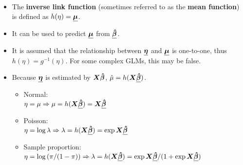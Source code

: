 \begin{frame}
  \begin{itemize}
    \vspace{0.15cm}
    \item The \textbf{inverse link function} (sometimes referred to as the \textbf{mean function}) is defined as $ h(\eta) = \boldsymbol{\underline{\mu}} $.
    \vspace{0.25cm}
    \item It can be used to predict $ \boldsymbol{\underline{\mu}} $ from $ \boldsymbol{\underline{\hat{\beta}}} $. 
    \vspace{0.25cm}
    \item It is assumed that the relationship between $ \boldsymbol{\underline{\eta}} $ and $ \boldsymbol{\underline{\mu}} $ is one-to-one, thus $ h(\eta) = g^{-1}(\eta) $. For some complex GLMs, this may be false.
    \vspace{0.25cm}
    \item Because $ \boldsymbol{\underline{\eta}} $ is estimated by $ \boldsymbol{X}\boldsymbol{\hat{\beta}}$, $ \hat{\mu} = h(\boldsymbol{X}\boldsymbol{\underline{\hat{\beta}}}) $.
      \begin{itemize}
        \vspace{0.15cm}
        \item Normal: \\
          \hspace{1cm} $ \eta = \mu \Rightarrow \mu = h(\boldsymbol{X}\boldsymbol{\underline{\hat{\beta}}}) = \boldsymbol{X}\boldsymbol{\underline{\hat{\beta}}} $
        \vspace{0.15cm}
        \item Poisson: \\
          \hspace{1cm} $ \eta = \log{\lambda} \Rightarrow \lambda = h(\boldsymbol{X}\boldsymbol{\underline{\hat{\beta}}}) = \exp{\boldsymbol{X}\boldsymbol{\underline{\hat{\beta}}}} $
        \vspace{0.15cm}
        \item Sample proportion: \\
          \hspace{1cm} $ \eta = \log{(\pi/(1-\pi))} \Rightarrow \lambda = h(\boldsymbol{X}\boldsymbol{\underline{\hat{\beta}}}) = \exp{\boldsymbol{X}\boldsymbol{\underline{\hat{\beta}}}}/(1+\exp{\boldsymbol{X}\boldsymbol{\underline{\hat{\beta}}}}) $ \\
      \end{itemize}
  \end{itemize}
\end{frame}




